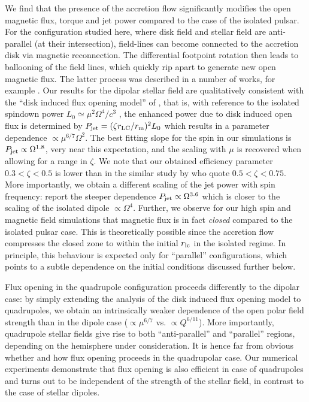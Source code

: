 \documentclass[fleqn,usenatbib]{mnras}
\begin{document}
We find that the presence of the accretion flow significantly modifies the open magnetic flux, torque and jet power compared to the case of the isolated pulsar.  For the configuration studied here, where disk field and stellar field are anti-parallel (at their intersection), field-lines can become connected to the accretion disk via magnetic reconnection.  The differential footpoint rotation then leads to ballooning of the field lines, which quickly rip apart to generate new open magnetic flux.  The latter process was described in a number of works, for example  \citet{Uzdensky2002a,Uzdensky2002b,LyndenBell2003,Parfrey2016,Ferreira2000}.  Our results for the dipolar stellar field are qualitatively consistent with the ``disk induced flux opening model'' of \cite{Parfrey2016}, that is, with reference to the isolated spindown power $L_0\simeq\mu^2\Omega^4/c^3$ \citep[][]{Gruzinov2005}, the enhanced power due to disk induced open flux is determined by $P_{\rm jet}=(\zeta r_{\rm LC}/r_{\rm m})^2 L_0$ which results in a parameter dependence $\propto\mu^{6/7}\Omega^{2}$.  
The best fitting slope for the spin in our simulations is $P_{\rm jet}\propto \Omega^{1.8}$, very near this expectation, and the scaling with $\mu$ is recovered when allowing for a range in $\zeta$. 
We note that our obtained efficiency parameter $0.3<\zeta<0.5$ is lower than in the similar study by  who quote $0.5<\zeta<0.75$.  More importantly, we obtain a different scaling of the jet power with spin frequency:  report the steeper dependence $P_{\rm jet}\propto \Omega^{3.6}$ which is closer to the scaling of the isolated dipole $\propto\Omega^4$.  
Further, we observe for our high spin and magnetic field simulations that magnetic flux is in fact \textit{closed} compared to the isolated pulsar case.  This is theoretically possible since the accretion flow compresses the closed zone to within the initial $r_{\rm lc}$ in the isolated regime.  In principle, this behaviour is expected only for ``parallel'' configurations, which points to a subtle dependence on the initial conditions discussed further below.  

Flux opening in the quadrupole configuration proceeds differently to the dipolar case: by simply extending the analysis of the disk induced flux opening model to quadrupoles, we obtain an intrinsically weaker dependence of the open polar field strength than in the dipole case ($\propto \mu^{6/7}$ vs. $\propto Q^{6/11}$).  
More importantly, quadrupole stellar fields give rise to both ``anti-parallel'' and ``parallel'' regions, depending on the hemisphere under consideration.  It is hence far from obvious whether and how flux opening proceeds in the quadrupolar case. Our numerical experiments demonstrate that flux opening is also efficient in case of quadrupoles and turns out to be independent of the strength of the stellar field, in contrast to the case of stellar dipoles.  
\end{document}
